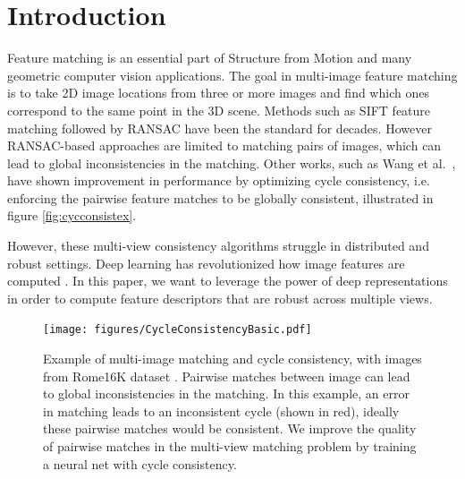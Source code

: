 \documentclass[10pt,twocolumn,letterpaper]{article}
\begin{document}
\section{Introduction}

Feature matching is an essential part of Structure from Motion and many geometric computer vision applications.
The goal in multi-image feature matching is to take 2D image locations from three or more images and find which ones correspond to the same point in the 3D scene.
Methods such as SIFT feature matching \cite{lowe2004distinctive} followed by RANSAC \cite{fischler1981random} have been the standard for decades.
However RANSAC-based approaches are limited to matching pairs of images, which can lead to global inconsistencies in the matching.
Other works, such as Wang et al.~\cite{wang2017multi}, have shown improvement in performance by optimizing cycle consistency, i.e. enforcing the pairwise feature matches to be globally consistent, illustrated in figure \ref{fig:cycconsistex}.

However, these multi-view consistency algorithms struggle in distributed and robust settings.
Deep learning has revolutionized how image features are computed \cite{yi2016lift}.
In this paper, we want to leverage the power of deep representations in order to compute feature descriptors that are robust across multiple views.

\begin{figure}[t]
\begin{center}
  \texttt{[image: figures/CycleConsistencyBasic.pdf]}
\end{center}
  \caption{
    Example of multi-image matching and cycle consistency, with images from Rome16K dataset \cite{li2010location}.
    Pairwise matches between image can lead to global inconsistencies in the matching.
    In this example, an error in matching leads to an inconsistent cycle (shown in red), ideally these pairwise matches would be consistent.
    We improve the quality of pairwise matches in the multi-view matching problem by training a neural net with cycle consistency.
  }
\label{fig:cycconsistex}
\label{fig:onecol}
\end{figure}
\end{document}
